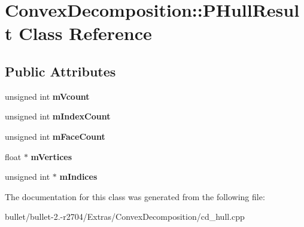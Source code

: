 \hypertarget{class_convex_decomposition_1_1_p_hull_result}{\section{Convex\+Decomposition\+:\+:P\+Hull\+Result Class Reference}
\label{class_convex_decomposition_1_1_p_hull_result}
}
\subsection*{Public Attributes}
\begin{DoxyCompactItemize}
\item 
\hypertarget{class_convex_decomposition_1_1_p_hull_result_a94f4b8419613da2718e81dfb6921443a}{unsigned int {\bfseries m\+Vcount}}\label{class_convex_decomposition_1_1_p_hull_result_a94f4b8419613da2718e81dfb6921443a}

\item 
\hypertarget{class_convex_decomposition_1_1_p_hull_result_a4e8963afe84d786175a7a4c0a5c04ea4}{unsigned int {\bfseries m\+Index\+Count}}\label{class_convex_decomposition_1_1_p_hull_result_a4e8963afe84d786175a7a4c0a5c04ea4}

\item 
\hypertarget{class_convex_decomposition_1_1_p_hull_result_a85bdb2b9d7e854bd15397919027fa4c9}{unsigned int {\bfseries m\+Face\+Count}}\label{class_convex_decomposition_1_1_p_hull_result_a85bdb2b9d7e854bd15397919027fa4c9}

\item 
\hypertarget{class_convex_decomposition_1_1_p_hull_result_a44406ee18554d822da9697f2b1a08e4b}{float $\ast$ {\bfseries m\+Vertices}}\label{class_convex_decomposition_1_1_p_hull_result_a44406ee18554d822da9697f2b1a08e4b}

\item 
\hypertarget{class_convex_decomposition_1_1_p_hull_result_a8c2536eb03a4ff514593d5bcec4fd030}{unsigned int $\ast$ {\bfseries m\+Indices}}\label{class_convex_decomposition_1_1_p_hull_result_a8c2536eb03a4ff514593d5bcec4fd030}

\end{DoxyCompactItemize}


The documentation for this class was generated from the following file\+:\begin{DoxyCompactItemize}
\item 
bullet/bullet-\/2.-\/r2704/\+Extras/\+Convex\+Decomposition/cd\+\_\+hull.\+cpp\end{DoxyCompactItemize}
